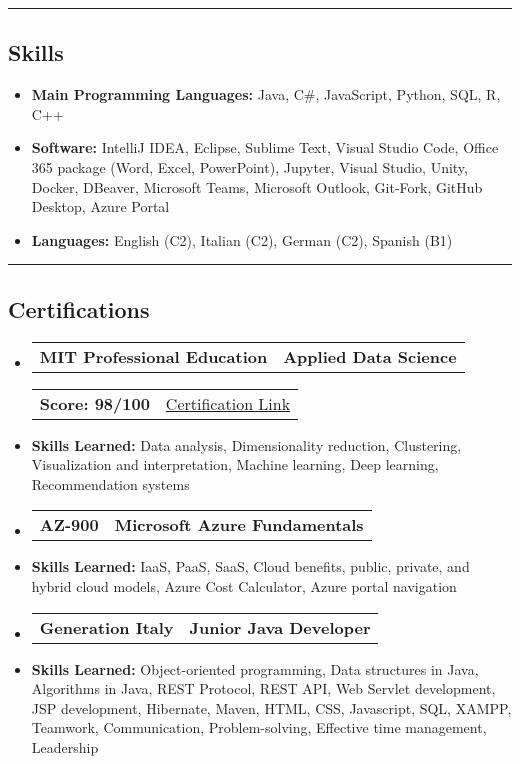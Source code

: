\documentclass[11pt,letterpaper]{article}
\makeatletter
\newcommand{\headerrow}[2]
{\begin{tabular*}{\linewidth}{l@{\extracolsep{\fill}}r}
#1 &
#2 \\
\end{tabular*}}
\makeatother
\begin{document}
\hrule
\vspace{-1em}
\subsection*{\Large Skills}

\begin{itemize}[leftmargin=1em,noitemsep]
	\item \textbf{Main Programming Languages:} Java, C\#, JavaScript, Python, SQL, R, C++
	\item \textbf{Software:} IntelliJ IDEA, Eclipse, Sublime Text, Visual Studio Code, Office 365 package (Word, Excel, PowerPoint), Jupyter, Visual Studio, Unity, Docker, DBeaver, Microsoft Teams, Microsoft Outlook, Git-Fork, GitHub Desktop, Azure Portal
	\item \textbf{Languages:} English (C2), Italian (C2), German (C2), Spanish (B1)
\end{itemize}

\hrule
\vspace{-1em}
\subsection*{\Large Certifications}

\begin{itemize}[leftmargin=1em]
	\parskip=0.1em
	\item
	      \headerrow
	      {\textbf{MIT Professional Education}}
	      {\textbf{Applied Data Science}}
	      \headerrow
	      {\textbf{Score: 98/100}}
	      {\href{https://www.credential.net/06861b98-4e6f-4009-a5d2-f2fe0cbdded4}{Certification Link}}
        \item \textbf{Skills Learned:} Data analysis, Dimensionality reduction, Clustering, Visualization and interpretation, Machine learning, Deep learning, Recommendation systems
        
	\item
	     \headerrow
	     {\textbf{AZ-900}}
	     {\textbf{Microsoft Azure Fundamentals}}
	     \item \textbf{Skills Learned:} IaaS, PaaS, SaaS, Cloud benefits, public, private, and hybrid cloud models, Azure Cost Calculator, Azure portal navigation
    \item
	    \headerrow
	    {\textbf{Generation Italy}}
	    {\textbf{Junior Java Developer}}
	    \item \textbf{Skills Learned:} Object-oriented programming, Data structures in Java, Algorithms in Java, REST Protocol, REST API, Web Servlet development, JSP development, Hibernate,  Maven, HTML, CSS, Javascript, SQL, XAMPP, Teamwork, Communication, Problem-solving, Effective time management, Leadership
    
\end{itemize}
\end{document}
